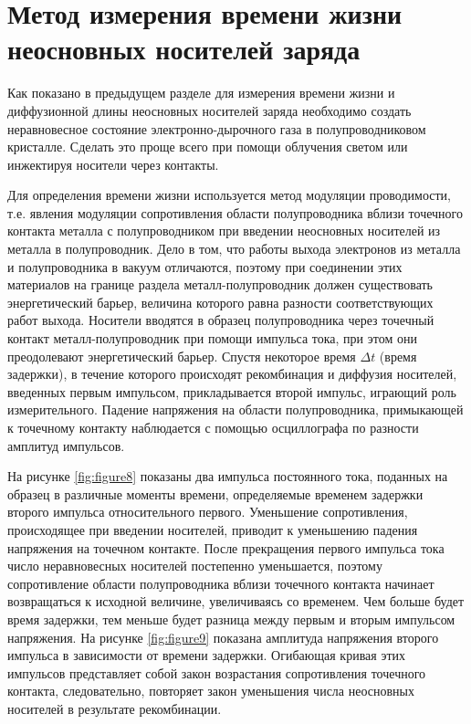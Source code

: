 \section{Метод измерения времени жизни неосновных носителей заряда}
Как показано в предыдущем разделе для измерения времени жизни и диффузионной длины неосновных носителей заряда
необходимо создать неравновесное состояние электронно-дырочного газа в полупроводниковом кристалле. Сделать это проще
всего при помощи облучения светом или инжектируя носители через контакты.

Для определения времени жизни используется метод модуляции проводимости, т.е. явления модуляции сопротивления области
полупроводника вблизи точечного контакта металла с полупроводником при введении неосновных носителей из металла в
полупроводник. Дело в том, что работы выхода электронов из металла и полупроводника в вакуум отличаются, поэтому при
соединении этих материалов на границе раздела металл-полупроводник должен существовать энергетический барьер, величина
которого равна разности соответствующих работ выхода. Носители вводятся в образец полупроводника через точечный контакт
металл-полупроводник при помощи импульса тока, при этом они преодолевают энергетический барьер. Спустя некоторое время
$\Delta t$ (время задержки), в течение которого происходят рекомбинация и диффузия носителей, введенных первым
импульсом, прикладывается второй импульс, играющий роль измерительного. Падение напряжения на области полупроводника,
примыкающей к точечному контакту наблюдается с помощью осциллографа по разности амплитуд импульсов.

На рисунке \ref{fig:figure8} показаны два импульса постоянного тока, поданных на образец в различные моменты времени,
определяемые временем задержки второго импульса относительного первого. Уменьшение сопротивления, происходящее при
введении носителей, приводит к уменьшению падения напряжения на точечном контакте. После прекращения первого
импульса тока число неравновесных носителей постепенно уменьшается, поэтому сопротивление
области полупроводника вблизи точечного контакта начинает возвращаться к исходной величине, увеличиваясь со временем.
Чем больше будет время задержки, тем меньше будет разница между первым и вторым импульсом напряжения. На рисунке \ref{fig:figure9} показана
амплитуда напряжения второго импульса в зависимости от времени задержки. Огибающая кривая этих импульсов представляет
собой закон возрастания сопротивления точечного контакта, следовательно, повторяет закон уменьшения числа неосновных
носителей в результате рекомбинации.

